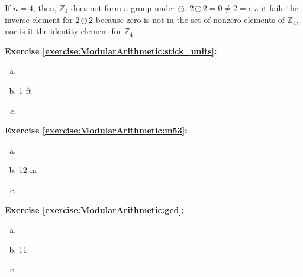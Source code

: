 \begin{enumerate}[(a)]
If $n = 4$, then, $\mathbb Z_{4}$ does not form a group under $\odot$. $2\odot 2 = 0\neq2 = e\  \therefore$ it fails the inverse element for $2\odot 2$ because zero is not in the set of nonzero elements of $\mathbb Z_{4}$, nor is it the identity element for $\mathbb Z_{4}$
\end{enumerate}


\noindent\textbf{Exercise \ref{exercise:ModularArithmetic:stick_units}:} 
\begin{enumerate}[(a)]
\item

\item
1 ft

\item
\end{enumerate}

\noindent\textbf{Exercise \ref{exercise:ModularArithmetic:m53}:}
\begin{enumerate}[(a)]
\item

\item
12 in

\item
\end{enumerate}

\noindent\textbf{Exercise \ref{exercise:ModularArithmetic:gcd}:}
\begin{enumerate}[(a)]
\item

\item
11
\item

\end{enumerate}

